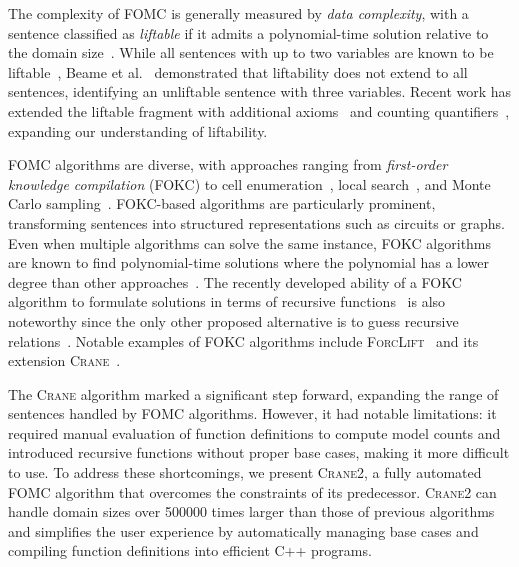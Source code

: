 \documentclass[a4paper,UKenglish,cleveref,autoref]{lipics-v2021}
\newcommand{\Cranetwo}{\textsc{Crane2}}
\begin{document}
The complexity of FOMC is generally measured by \emph{data complexity}, with a
sentence classified as \emph{liftable} if it admits a polynomial-time solution
relative to the domain size~\cite{DBLP:conf/starai/JaegerB12}. While all
sentences with up to two variables are known to be
liftable~\cite{DBLP:conf/nips/Broeck11,DBLP:conf/kr/BroeckMD14}, Beame et
al.~\cite{DBLP:conf/pods/BeameBGS15} demonstrated that liftability does not
extend to all sentences, identifying an unliftable sentence with three
variables. Recent work has extended the liftable fragment with additional
axioms~\cite{DBLP:conf/aaai/TothK23,DBLP:journals/ai/BremenK23} and counting
quantifiers~\cite{DBLP:journals/jair/Kuzelka21}, expanding our understanding of
liftability.

FOMC algorithms are diverse, with approaches ranging from \emph{first-order
  knowledge compilation} (FOKC) to cell
enumeration~\cite{DBLP:conf/uai/BremenK21}, local
search~\cite{DBLP:journals/pvldb/NiuRDS11}, and Monte Carlo
sampling~\cite{DBLP:journals/cacm/GogateD16}. FOKC-based algorithms are
particularly prominent, transforming sentences into structured representations
such as circuits or graphs. Even when multiple algorithms can solve the same
instance, FOKC algorithms are known to find polynomial-time solutions where the
polynomial has a lower degree than other
approaches~\cite{DBLP:conf/kr/DilkasB23}. The recently developed ability of a
FOKC algorithm to formulate solutions in terms of recursive
functions~\cite{DBLP:conf/kr/DilkasB23} is also noteworthy since the only other
proposed alternative is to guess recursive
relations~\cite{DBLP:conf/ilp/BarvinekB0ZK21}. Notable examples of FOKC
algorithms include \textsc{ForcLift}~\cite{DBLP:conf/ijcai/BroeckTMDR11} and its
extension \textsc{Crane}~\cite{DBLP:conf/kr/DilkasB23}.

The \textsc{Crane} algorithm marked a significant step forward, expanding the
range of sentences handled by FOMC algorithms. However, it had notable
limitations: it required manual evaluation of function definitions to compute
model counts and introduced recursive functions without proper base cases,
making it more difficult to use. To address these shortcomings, we present
\Cranetwo{}, a fully automated FOMC algorithm that overcomes the constraints of
its predecessor. \Cranetwo{} can handle domain sizes over \num{500000} times
larger than those of previous algorithms and simplifies the user experience by
automatically managing base cases and compiling function definitions into
efficient C++ programs.
\end{document}
